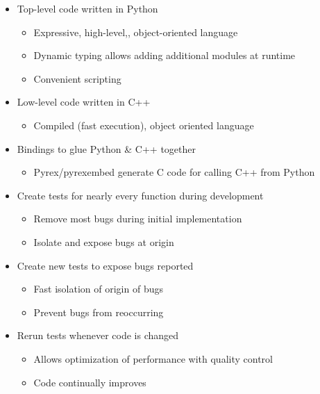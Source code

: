 \documentclass[pdftex,cig,slideColor]{pp4slides}
\begin{document}
  \begin{itemize}
  \item Top-level code written in Python
    \begin{itemize}
    \item Expressive, high-level,, object-oriented language
    \item Dynamic typing allows adding additional modules at runtime
    \item Convenient scripting
    \end{itemize}
  \item Low-level code written in C++
    \begin{itemize}
    \item Compiled (fast execution), object oriented language
    \end{itemize}
  \item Bindings to glue Python \& C++ together
    \begin{itemize}
    \item Pyrex/pyrexembed generate C code for calling C++ from Python
    \end{itemize}
  \end{itemize}

 
 \begin{itemize}
 \item Create tests for nearly every function during development
   \begin{itemize}
   \item Remove most bugs during initial implementation
   \item Isolate and expose bugs at origin
   \end{itemize}
 \item Create new tests to expose bugs reported
   \begin{itemize}
   \item Fast isolation of origin of bugs
   \item Prevent bugs from reoccurring
   \end{itemize}
 \item Rerun tests whenever code is changed
   \begin{itemize}
   \item Allows optimization of performance with quality control
   \item Code continually improves
   \end{itemize}
 \end{itemize}
  
\end{document}
